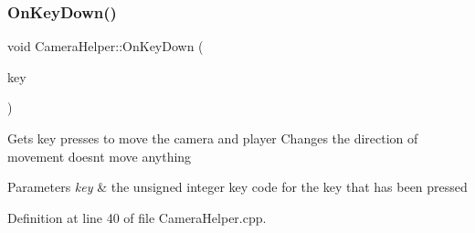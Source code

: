\subsubsection{\texorpdfstring{On\+Key\+Down()}{OnKeyDown()}}
{\footnotesize\ttfamily void Camera\+Helper\+::\+On\+Key\+Down (\begin{DoxyParamCaption}\item[{U\+I\+NT}]{key }\end{DoxyParamCaption})}

Gets key presses to move the camera and player Changes the direction of movement doesn\textquotesingle{}t move anything 
\begin{DoxyParams}{Parameters}
{\em key} & the unsigned integer key code for the key that has been pressed \\
\hline
\end{DoxyParams}


Definition at line 40 of file Camera\+Helper.\+cpp.


